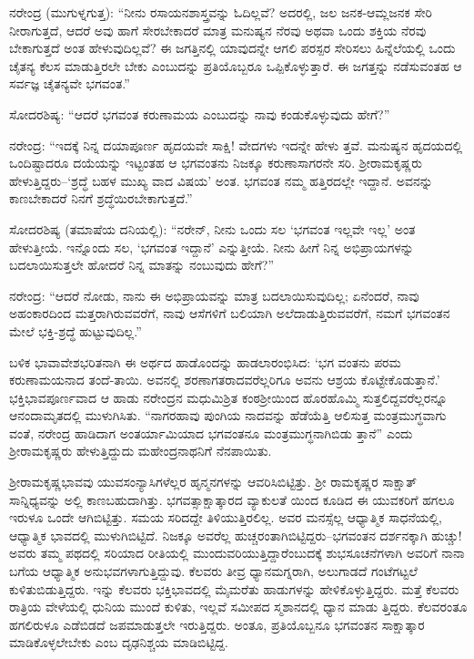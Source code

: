 ನರೇಂದ್ರ (ಮುಗುಳ್ನಗುತ್ತ): “ನೀನು ರಸಾಯನಶಾಸ್ತ್ರವನ್ನು ಓದಿಲ್ಲವೆ? ಅದರಲ್ಲಿ, ಜಲ ಜನಕ-ಆಮ್ಲಜನಕ ಸೇರಿ ನೀರಾಗುತ್ತದೆ, ಆದರೆ ಅವು ಹಾಗೆ ಸೇರಬೇಕಾದರೆ ಮಾತ್ರ ಮನುಷ್ಯನ ನೆರವು ಅಥವಾ ಒಂದು ಶಕ್ತಿಯ ನೆರವು ಬೇಕಾಗುತ್ತದೆ ಅಂತ ಹೇಳುವುದಿಲ್ಲವೆ? ಈ ಜಗತ್ತಿನಲ್ಲಿ ಯಾವುದನ್ನೇ ಆಗಲಿ ಪರಸ್ಪರ ಸೇರಿಸಲು ಹಿನ್ನೆಲೆಯಲ್ಲಿ ಒಂದು ಚೈತನ್ಯ ಕೆಲಸ ಮಾಡುತ್ತಿರಲೇ ಬೇಕು ಎಂಬುದನ್ನು ಪ್ರತಿಯೊಬ್ಬರೂ ಒಪ್ಪಿಕೊಳ್ಳುತ್ತಾರೆ. ಈ ಜಗತ್ತನ್ನು ನಡೆಸುವಂತಹ ಆ ಸರ್ವಜ್ಞ ಚೈತನ್ಯವೇ ಭಗವಂತ.”

ಸೋದರಶಿಷ್ಯ: “ಆದರೆ ಭಗವಂತ ಕರುಣಾಮಯ ಎಂಬುದನ್ನು ನಾವು ಕಂಡುಕೊಳ್ಳುವುದು ಹೇಗೆ?”

ನರೇಂದ್ರ: “ಇದಕ್ಕೆ ನಿನ್ನ ದಯಾಪೂರ್ಣ ಹೃದಯವೇ ಸಾಕ್ಷಿ! ವೇದಗಳು ಇದನ್ನೇ ಹೇಳು ತ್ತವೆ. ಮನುಷ್ಯನ ಹೃದಯದಲ್ಲಿ ಒಂದಿಷ್ಟಾದರೂ ದಯೆಯನ್ನು ಇಟ್ಟಂತಹ ಆ ಭಗವಂತನು ನಿಜಕ್ಕೂ ಕರುಣಾಸಾಗರನೇ ಸರಿ. ಶ್ರೀರಾಮಕೃಷ್ಣರು ಹೇಳುತ್ತಿದ್ದರು–‘ಶ್ರದ್ಧೆ ಬಹಳ ಮುಖ್ಯ ವಾದ ವಿಷಯ’ ಅಂತ. ಭಗವಂತ ನಮ್ಮ ಹತ್ತಿರದಲ್ಲೇ ಇದ್ದಾನೆ. ಅವನನ್ನು ಕಾಣಬೇಕಾದರೆ ನಿನಗೆ ಶ್ರದ್ಧೆಯಿರಬೇಕಾಗುತ್ತದೆ.”

ಸೋದರಶಿಷ್ಯ (ತಮಾಷೆಯ ದನಿಯಲ್ಲಿ): “ನರೇನ್, ನೀನು ಒಂದು ಸಲ ‘ಭಗವಂತ ಇಲ್ಲವೇ ಇಲ್ಲ’ ಅಂತ ಹೇಳುತ್ತೀಯೆ. ಇನ್ನೊಂದು ಸಲ, ‘ಭಗವಂತ ಇದ್ದಾನೆ’ ಎನ್ನುತ್ತೀಯೆ. ನೀನು ಹೀಗೆ ನಿನ್ನ ಅಭಿಪ್ರಾಯಗಳನ್ನು ಬದಲಾಯಿಸುತ್ತಲೇ ಹೋದರೆ ನಿನ್ನ ಮಾತನ್ನು ನಂಬುವುದು ಹೇಗೆ?”

ನರೇಂದ್ರ: “ಆದರೆ ನೋಡು, ನಾನು ಈ ಅಭಿಪ್ರಾಯವನ್ನು ಮಾತ್ರ ಬದಲಾಯಿಸುವುದಿಲ್ಲ; ಏನೆಂದರೆ, ನಾವು ಅಹಂಕಾರದಿಂದ ಮತ್ತರಾಗಿರುವವರೆಗೆ, ನಾವು ಆಸೆಗಳಿಗೆ ಬಲಿಯಾಗಿ ಅಲೆದಾಡುತ್ತಿರುವವರೆಗೆ, ನಮಗೆ ಭಗವಂತನ ಮೇಲೆ ಭಕ್ತಿ-ಶ್ರದ್ಧೆ ಹುಟ್ಟುವುದಿಲ್ಲ.”

ಬಳಿಕ ಭಾವಾವೇಶಭರಿತನಾಗಿ ಈ ಅರ್ಥದ ಹಾಡೊಂದನ್ನು ಹಾಡಲಾರಂಭಿಸಿದ: ‘ಭಗ ವಂತನು ಪರಮ ಕರುಣಾಮಯನಾದ ತಂದೆ-ತಾಯಿ. ಅವನಲ್ಲಿ ಶರಣಾಗತರಾದವರೆಲ್ಲರಿಗೂ ಅವನು ಆಶ್ರಯ ಕೊಟ್ಟೇಕೊಡುತ್ತಾನೆ.’ ಭಕ್ತಿಭಾವಪೂರ್ಣವಾದ ಆ ಹಾಡು ನರೇಂದ್ರನ ಮಧುಮಿಶ್ರಿತ ಕಂಠಶ್ರೀಯಿಂದ ಹೊರಹೊಮ್ಮಿ ಸುತ್ತಲಿದ್ದವರೆಲ್ಲರನ್ನೂ ಆನಂದಾಮೃತದಲ್ಲಿ ಮುಳುಗಿಸಿತು. “ನಾಗರಹಾವು ಪುಂಗಿಯ ನಾದವನ್ನು ಹೆಡೆಯೆತ್ತಿ ಆಲಿಸುತ್ತ ಮಂತ್ರಮುಗ್ಧವಾಗು ವಂತೆ, ನರೇಂದ್ರ ಹಾಡಿದಾಗ ಅಂತರ್ಯಾಮಿಯಾದ ಭಗವಂತನೂ ಮಂತ್ರಮುಗ್ಧನಾಗಿಬಿಡು ತ್ತಾನೆ” ಎಂದು ಶ್ರೀರಾಮಕೃಷ್ಣರು ಹೇಳುತ್ತಿದ್ದುದು ಮಹೇಂದ್ರನಾಥನಿಗೆ ನೆನಪಾಯಿತು.

ಶ್ರೀರಾಮಕೃಷ್ಣಭಾವವು ಯುವಸಂನ್ಯಾಸಿಗಳೆಲ್ಲರ ಹೃನ್ಮನಗಳನ್ನು ಆವರಿಸಿಬಿಟ್ಟಿತ್ತು. ಶ್ರೀ ರಾಮಕೃಷ್ಣರ ಸಾಕ್ಷಾತ್ ಸಾನ್ನಿಧ್ಯವನ್ನು ಅಲ್ಲಿ ಕಾಣಬಹುದಾಗಿತ್ತು. ಭಗವತ್ಸಾಕ್ಷಾತ್ಕಾರದ ವ್ಯಾಕುಲತೆ ಯಿಂದ ಕೂಡಿದ ಈ ಯುವಕರಿಗೆ ಹಗಲೂ ಇರುಳೂ ಒಂದೇ ಆಗಿಬಿಟ್ಟಿತ್ತು. ಸಮಯ ಸರಿದದ್ದೇ ತಿಳಿಯುತ್ತಿರಲಿಲ್ಲ. ಅವರ ಮನಸ್ಸೆಲ್ಲ ಆಧ್ಯಾತ್ಮಿಕ ಸಾಧನೆಯಲ್ಲಿ, ಆಧ್ಯಾತ್ಮಿಕ ಭಾವದಲ್ಲಿ ಮುಳುಗಿಬಿಟ್ಟಿದೆ. ನಿಜಕ್ಕೂ ಅವರೆಲ್ಲ ಹುಚ್ಚರಂತಾಗಿಬಿಟ್ಟಿದ್ದರು–ಭಗವಂತನ ದರ್ಶನಕ್ಕಾಗಿ ಹುಚ್ಚು! ಅವರು ತಮ್ಮ ಪಥದಲ್ಲಿ ಸರಿಯಾದ ರೀತಿಯಲ್ಲಿ ಮುಂದುವರಿಯುತ್ತಿದ್ದಾರೆಂಬುದಕ್ಕೆ ಶುಭಸೂಚನೆಗಳಾಗಿ ಅವರಿಗೆ ನಾನಾ ಬಗೆಯ ಆಧ್ಯಾತ್ಮಿಕ ಅನುಭವಗಳಾಗುತ್ತಿದ್ದುವು. ಕೆಲವರು ತೀವ್ರ ಧ್ಯಾನಮಗ್ನರಾಗಿ, ಅಲುಗಾಡದೆ ಗಂಟೆಗಟ್ಟಲೆ ಕುಳಿತುಬಿಡುತ್ತಿದ್ದರು. ಇನ್ನು ಕೆಲವರು ಭಕ್ತಿಭಾವದಲ್ಲಿ ಮೈಮರೆತು ಹಾಡುಗಳನ್ನು ಹೇಳಿಕೊಳ್ಳುತ್ತಿದ್ದರು. ಮತ್ತೆ ಕೆಲವರು ರಾತ್ರಿಯ ವೇಳೆಯಲ್ಲಿ ಧುನಿಯ ಮುಂದೆ ಕುಳಿತು, ಇಲ್ಲವೆ ಸಮೀಪದ ಸ್ಮಶಾನದಲ್ಲಿ ಧ್ಯಾನ ಮಾಡು ತ್ತಿದ್ದರು. ಕೆಲವರಂತೂ ಹಗಲಿರುಳೂ ಎಡೆಬಿಡದೆ ಜಪಮಾಡುತ್ತಲೇ ಇರುತ್ತಿದ್ದರು. ಅಂತೂ, ಪ್ರತಿಯೊಬ್ಬನೂ ಭಗವಂತನ ಸಾಕ್ಷಾತ್ಕಾರ ಮಾಡಿಕೊಳ್ಳಲೇಬೇಕು ಎಂಬ ದೃಢನಿಶ್ಚಯ ಮಾಡಿಬಿಟ್ಟಿದ್ದ.

